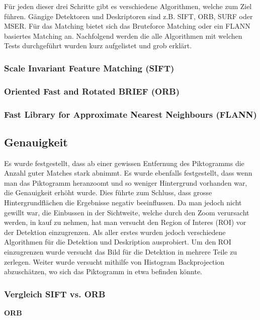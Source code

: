 Für jeden dieser drei Schritte gibt es verschiedene Algorithmen, welche zum Ziel führen. Gängige Detektoren und Deskriptoren sind z.B. SIFT, ORB, SURF oder MSER. Für das Matching bietet sich das Bruteforce Matching oder ein FLANN basiertes Matching an. Nachfolgend werden die alle Algorithmen mit welchen Tests durchgeführt wurden kurz aufgelistet und grob erklärt.

\subsubsection{Scale Invariant Feature Matching (SIFT)}

\subsubsection{Oriented Fast and Rotated BRIEF (ORB)}

\subsubsection{Fast Library for Approximate Nearest Neighbours (FLANN)}

\subsection{Genauigkeit}
Es wurde festgestellt, dass ab einer gewissen Entfernung des Piktogramms die Anzahl guter Matches stark abnimmt. Es wurde ebenfalls festgestellt, dass wenn man das Piktogramm heranzoomt und so weniger Hintergrund vorhanden war, die Genauigkeit erhöht wurde. Dies führte zum Schluss, dass grosse Hintergrundflächen die Ergebnisse negativ beeinflussen. Da man jedoch nicht gewillt war, die Einbussen in der Sichtweite, welche durch den Zoom verursacht werden, in kauf zu nehmen, hat man versucht den Region of Interes (ROI) vor der Detektion einzugrenzen. Als aller erstes wurden jedoch verschiedene Algorithmen für die Detektion und Deskription ausprobiert. Um den ROI einzugrenzen wurde versucht das Bild für die Detektion in mehrere Teile zu zerlegen. Weiter wurde versucht mithilfe von Histogram Backprojection abzuschätzen, wo sich das Piktogramm in etwa befinden könnte.

\subsubsection{Vergleich SIFT vs. ORB}
\textbf{ORB}\\

